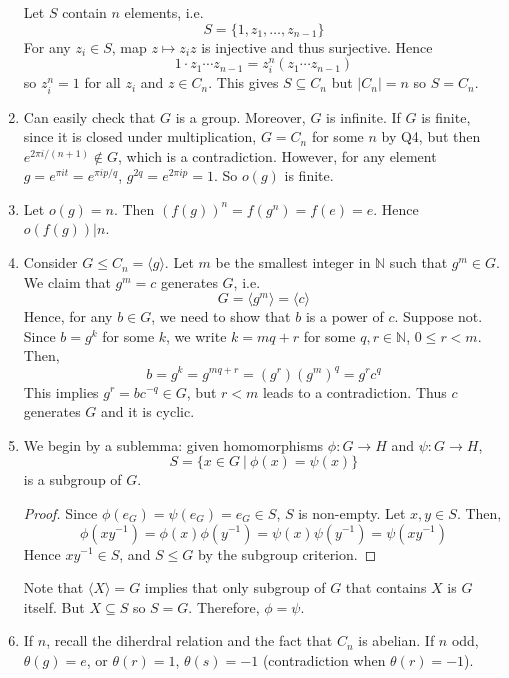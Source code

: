\documentclass[10pt, a4paper, twoside]{report}
\begin{document}
\begin{enumerate}[{1.}]
    Let \(S\) contain \(n\) elements, i.e. 
    \[S=\{1,z_1,\ldots,z_{n-1}\}\]
    For any \(z_i\in S\), map \(z\mapsto z_iz\) is injective and thus surjective. Hence 
    \[1\cdot z_1\cdots z_{n-1}=z_i^n(z_1\cdots z_{n-1})\]
    so \(z_i^n=1\) for all \(z_i\) and \(z\in C_n\). This gives \(S\subseteq C_n\) but \(|C_n|=n\) so \(S=C_n\).
    \item Can easily check that \(G\) is a group. Moreover, \(G\) is infinite. If \(G\) is finite, since it is closed under multiplication, \(G=C_n\) for some \(n\) by Q4, but then \(e^{2\pi i/(n+1)}\notin G\), which is a contradiction. However, for any element \(g=e^{\pi i t}=e^{\pi i p/q}\), \(g^{2q}=e^{2\pi i p}=1\). So \(o(g)\) is finite. 
    \item Let \(o(g)=n\). Then \(\left(f(g)\right)^n=f(g^n)=f(e)=e\). Hence \(o(f(g))|n\).
    \item Consider \(G\leq C_n=\langle g\rangle\). Let \(m\) be the smallest integer in \(\mathbb{N}\) such that \(g^m\in G\). We claim that \(g^m=c\) generates \(G\), i.e. 
    \[G=\langle g^m\rangle=\langle c\rangle\]
    Hence, for any \(b\in G\), we need to show that \(b\) is a power of \(c\). Suppose not. Since \(b=g^k\) for some \(k\), we write \(k=mq+r\) for some \(q,r\in\mathbb{N}\), \(0\leq r<m\). Then,
    \[b=g^k=g^{mq+r}=(g^r)(g^m)^q=g^rc^q\]
    This implies \(g^r=bc^{-q}\in G\), but \(r<m\) leads to a contradiction. Thus \(c\) generates \(G\) and it is cyclic.
    \item We begin by a sublemma: given homomorphisms \(\phi:G\to H\) and \(\psi:G\to H\), 
    \[S=\{x\in G\:|\:\phi(x)=\psi(x)\}\]
    is a subgroup of \(G\).
    \begin{proof}
        Since \(\phi(e_G)=\psi(e_G)=e_G\in S\), \(S\) is non-empty. Let \(x,y\in S\). Then,
        \[\phi(xy^{-1})=\phi(x)\phi(y^{-1})=\psi(x)\psi(y^{-1})=\psi(xy^{-1})\]
        Hence \(xy^{-1}\in S\), and \(S\leq G\) by the subgroup criterion. 
    \end{proof}
    Note that \(\langle X\rangle=G\) implies that only subgroup of \(G\) that contains \(X\) is \(G\) itself. But \(X\subseteq S\) so \(S=G\). Therefore, \(\phi=\psi\).
    \item If \(n\), recall the diherdral relation and the fact that \(C_n\) is abelian. If \(n\) odd, \(\theta(g)=e\), or \(\theta(r)=1\), \(\theta(s)=-1\) (contradiction when \(\theta(r)=-1\)).
    

\end{enumerate}
\end{document}
